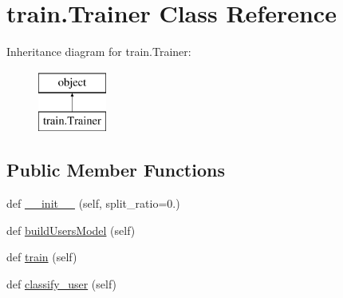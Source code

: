 \hypertarget{classtrain_1_1_trainer}{}\section{train.\+Trainer Class Reference}
\label{classtrain_1_1_trainer}
Inheritance diagram for train.\+Trainer\+:\begin{figure}[H]
\begin{center}
\leavevmode
\includegraphics[height=2.000000cm]{classtrain_1_1_trainer}
\end{center}
\end{figure}
\subsection*{Public Member Functions}
\begin{DoxyCompactItemize}
\item 
def \mbox{\hyperlink{classtrain_1_1_trainer_a6b737f139c2c40d775b82f39ea836c90}{\+\_\+\+\_\+init\+\_\+\+\_\+}} (self, split\+\_\+ratio=0.)
\item 
def \mbox{\hyperlink{classtrain_1_1_trainer_aa4cb6b5a4f8b87a958c9b6b62e6204b8}{build\+Users\+Model}} (self)
\item 
def \mbox{\hyperlink{classtrain_1_1_trainer_a9af45043f80d721cc77e5feaa80d589b}{train}} (self)
\item 
def \mbox{\hyperlink{classtrain_1_1_trainer_aff695c7da5cd408f7c89228edff8370d}{classify\+\_\+user}} (self)
\end{DoxyCompactItemize}
